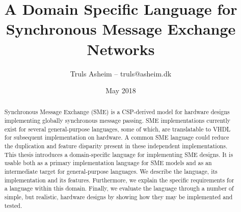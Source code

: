 \documentclass[oneside,a4paper,oldfontcommands]{memoir}
\author{Truls Asheim -- {\ttfamily truls@asheim.dk}}
\title{A Domain Specific Language for Synchronous Message Exchange Networks}
\date{May 2018}
\begin{document}
\frontmatter

\begin{titlingpage}
\maketitle
\end{titlingpage}

\newpage
\pagestyle{plain}
\begin{abstract}
  Synchronous Message Exchange (SME) is a CSP-derived model for hardware designs
  implementing globally synchronous message passing. SME implementations
  currently exist for several general-purpose languages, some of which, are
  translatable to VHDL for subsequent implementation on hardware. A common SME
  language could reduce the duplication and feature disparity present in these
  independent implementations. This thesis introduces a domain-specific language
  for implementing SME designs. It is usable both as a primary implementation
  language for SME models and as an intermediate target for general-purpose
  languages. We describe the language, its implementation and its
  features. Furthermore, we explain the specific requirements for a language
  within this domain. Finally, we evaluate the language through a number of
  simple, but realistic, hardware designs by showing how they may be implemented
  and tested.
\end{abstract}
\newpage


\newpage
\tableofcontents

\printglossary[type=\acronymtype,title=Abbrevations]


\mainmatter




%








\printbibliography{}
\end{document}
